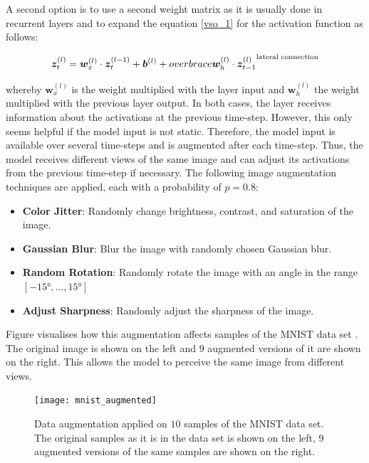 A second option is to use a second weight matrix as it is usually done in recurrent layers and to expand the equation \eqref{vso_1} for the activation function as follows:

\begin{equation}\eqlbl{vso_13}
		\boldsymbol{z}^{(l)}_t =  \boldsymbol{w}_x^{(l)} \cdot \boldsymbol{z}^{(l-1)}_t + \boldsymbol{b}^{(l)} + overbrace{\boldsymbol{w}_h^{(l)} \cdot \boldsymbol{z}^{(l)}_{t-1} }^{\text{lateral connection}}
\end{equation}

whereby $\boldsymbol{w}_x^{(l)}$ is the weight multiplied with the layer input and $\boldsymbol{w}_h^{(l)}$ the weight multiplied with the previous layer output. In both cases, the layer receives information about the activations at the previous time-step.
However, this only seems helpful if the model input is not static. Therefore, the model input is available over several time-steps and is augmented after each time-step. Thus, the model receives different views of the same image and can adjust its activations from the previous time-step if necessary. The following image augmentation techniques are applied, each with a probability of $p=0.8$:

\begin{itemize}
	\item \textbf{Color Jitter}: Randomly change brightness, contrast, and saturation of the image.
	\item \textbf{Gaussian Blur}: Blur the image with randomly chosen Gaussian blur.
	\item \textbf{Random Rotation}: Randomly rotate the image with an angle in the range $[-15°, ..., 15°]$
	\item \textbf{Adjust Sharpness}: Randomly adjust the sharpness of the image.
\end{itemize}

Figure  visualises how this augmentation affects samples of the MNIST data set \cite{Lecun_Bottou_Bengio_Haffner_1998}. The original image is shown on the left and $9$ augmented versions of it are shown on the right. This allows the model to perceive the same image from different views.

\begin{figure}[h]
    \centering
    \texttt{[image: mnist\_augmented]}
    \caption[Data augmentation applied on $10$ samples of the MNIST data set]{Data augmentation applied on $10$ samples of the MNIST data set. The original samples as it is in the data set is shown on the left, $9$ augmented versions of the same samples are shown on the right.}
\end{figure}



